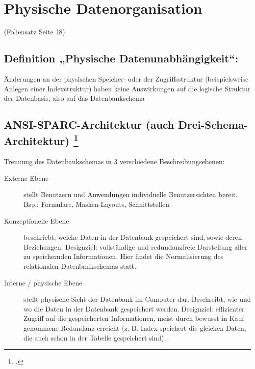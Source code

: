 \documentclass{lehramt-informatik}
\begin{document}
\chapter{Physische Datenorganisation}

\tableofcontents

(Foliensatz Seite 18)

\section{Definition „Physische Datenunabhängigkeit“:}

\begin{mdframed}
Änderungen an der physischen Speicher- oder der Zugriffsstruktur
(beispielsweise Anlegen einer Indexstruktur) haben keine Auswirkungen
auf die logische Struktur der Datenbasis, also auf das Datenbankschema
\end{mdframed}

%

\section{ANSI-SPARC-Architektur (auch Drei-Schema-Architektur)
\footcite[Seite 443, 13.1.3 Architektur eines Datenbanksystems]{schneider}
}

Trennung des Datenbankschemas in 3 verschiedene Beschreibungsebenen:

\begin{description}
\item[Externe Ebene]

stellt Benutzern und Anwendungen individuelle Benutzersichten bereit.
Bsp.: Formulare, Masken-Layouts, Schnittstellen

\item[Konzeptionelle Ebene]

beschriebt, welche Daten in der Datenbank gespeichert sind, sowie deren
Beziehungen. Designziel: vollständige und redundanzfreie Darstellung
aller zu speichernden Informationen. Hier findet die Normalisierung des
relationalen Datenbankschemas statt.

\item[Interne / physische Ebene]

stellt physische Sicht der Datenbank im Computer dar. Beschreibt, wie
und wo die Daten in der Datenbank gespeichert werden. Designziel:
effizienter Zugriff auf die gespeicherten Informationen, meist durch
bewusst in Kauf genommene Redundanz erreicht (z. B. Index speichert die
gleichen Daten, die auch schon in der Tabelle gespeichert sind).

\end{description}
\end{document}
